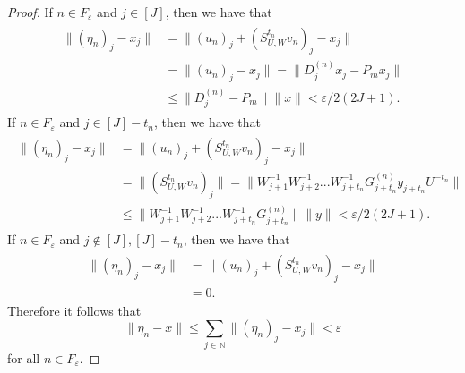 \documentclass{article}
\begin{document}
\begin{proof}
If $n\in F_{\varepsilon}$ and $j\in [J]$, then we have that
\begin{eqnarray}\begin{split}\nonumber
\|(\eta_{n})_{j}-x_{j}\|&=\|(u_{n})_{j}+(S^{t_{n}}_{U,W}v_{n})_{j}-x_{j}\|\\
&=\|(u_{n})_{j}-x_{j}\|=\|D^{(n)}_{j}x_{j}-P_{m}x_{j}\|\\
&\leq\|D^{(n)}_{j}-P_{m}\|\|x\|<\varepsilon/2(2J+1).
\end{split}\end{eqnarray}
If $n\in F_{\varepsilon}$ and $j\in [J]-t_{n}$, then we have that
\begin{eqnarray}\begin{split}\nonumber
\|(\eta_{n})_{j}-x_{j}\|&=\|(u_{n})_{j}+(S^{t_{n}}_{U,W}v_{n})_{j}-x_{j}\|\\
&=\|(S^{t_{n}}_{U,W}v_{n})_{j}\|=\|W^{-1}_{j+1}W^{-1}_{j+2}...W^{-1}_{j+t_{n}}G^{(n)}_{j+t_{n}}y_{j+t_{n}}U^{-t_{n}}\|\\
&\leq \|W^{-1}_{j+1}W^{-1}_{j+2}...W^{-1}_{j+t_{n}}G^{(n)}_{j+t_{n}}\|\|y\|<\varepsilon/2(2J+1).
\end{split}\end{eqnarray}
If $n\in F_{\varepsilon}$ and $j\notin [J], [J]-t_{n}$, then we have that
\begin{eqnarray}\begin{split}\nonumber
\|(\eta_{n})_{j}-x_{j}\|&=\|(u_{n})_{j}+(S^{t_{n}}_{U,W}v_{n})_{j}-x_{j}\|\\
&=0.
\end{split}\end{eqnarray}
Therefore it follows that
\[\|\eta_{n}-x\|\leq\sum_{j\in\mathbb{N}}\|(\eta_{n})_{j}-x_{j}\|<\varepsilon\]
for all $n\in F_{\varepsilon}$.


\end{proof}
\end{document}
